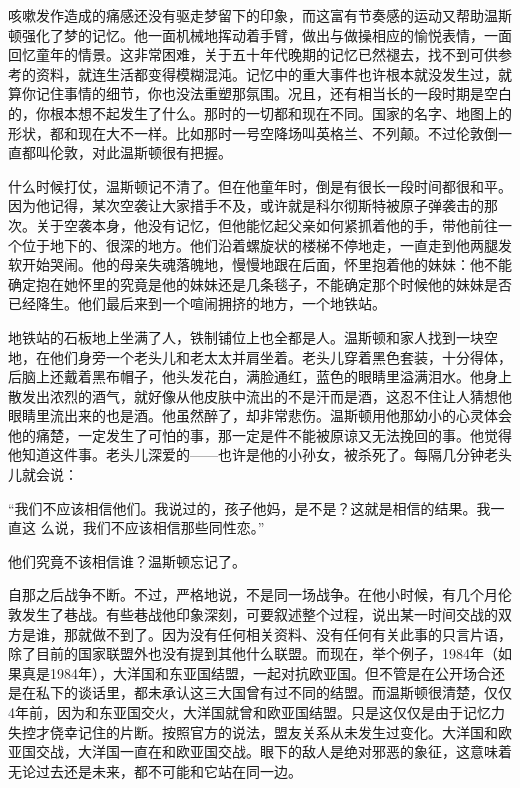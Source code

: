咳嗽发作造成的痛感还没有驱走梦留下的印象，而这富有节奏感的运动又帮助温斯顿强化了梦的记忆。他一面机械地挥动着手臂，做出与做操相应的愉悦表情，一面回忆童年的情景。这非常困难，关于五十年代晚期的记忆已然褪去，找不到可供参考的资料，就连生活都变得模糊混沌。记忆中的重大事件也许根本就没发生过，就算你记住事情的细节，你也没法重塑那氛围。况且，还有相当长的一段时期是空白的，你根本想不起发生了什么。那时的一切都和现在不同。国家的名字、地图上的形状，都和现在大不一样。比如那时一号空降场叫英格兰、不列颠。不过伦敦倒一直都叫伦敦，对此温斯顿很有把握。

什么时候打仗，温斯顿记不清了。但在他童年时，倒是有很长一段时间都很和平。因为他记得，某次空袭让大家措手不及，或许就是科尔彻斯特被原子弹袭击的那次。关于空袭本身，他没有记忆，但他能忆起父亲如何紧抓着他的手，带他前往一个位于地下的、很深的地方。他们沿着螺旋状的楼梯不停地走，一直走到他两腿发软开始哭闹。他的母亲失魂落魄地，慢慢地跟在后面，怀里抱着他的妹妹：他不能确定抱在她怀里的究竟是他的妹妹还是几条毯子，不能确定那个时候他的妹妹是否已经降生。他们最后来到一个喧闹拥挤的地方，一个地铁站。

地铁站的石板地上坐满了人，铁制铺位上也全都是人。温斯顿和家人找到一块空地，在他们身旁一个老头儿和老太太并肩坐着。老头儿穿着黑色套装，十分得体，后脑上还戴着黑布帽子，他头发花白，满脸通红，蓝色的眼睛里溢满泪水。他身上散发出浓烈的酒气，就好像从他皮肤中流出的不是汗而是酒，这忍不住让人猜想他眼睛里流出来的也是酒。他虽然醉了，却非常悲伤。温斯顿用他那幼小的心灵体会他的痛楚，一定发生了可怕的事，那一定是件不能被原谅又无法挽回的事。他觉得他知道这件事。老头儿深爱的——也许是他的小孙女，被杀死了。每隔几分钟老头儿就会说：

``我们不应该相信他们。我说过的，孩子他妈，是不是？这就是相信的结果。我一直这
么说，我们不应该相信那些同性恋。''

他们究竟不该相信谁？温斯顿忘记了。

自那之后战争不断。不过，严格地说，不是同一场战争。在他小时候，有几个月伦敦发生了巷战。有些巷战他印象深刻，可要叙述整个过程，说出某一时间交战的双方是谁，那就做不到了。因为没有任何相关资料、没有任何有关此事的只言片语，除了目前的国家联盟外也没有提到其他什么联盟。而现在，举个例子，1984年（如果真是1984年），大洋国和东亚国结盟，一起对抗欧亚国。但不管是在公开场合还是在私下的谈话里，都未承认这三大国曾有过不同的结盟。而温斯顿很清楚，仅仅4年前，因为和东亚国交火，大洋国就曾和欧亚国结盟。只是这仅仅是由于记忆力失控才侥幸记住的片断。按照官方的说法，盟友关系从未发生过变化。大洋国和欧亚国交战，大洋国一直在和欧亚国交战。眼下的敌人是绝对邪恶的象征，这意味着无论过去还是未来，都不可能和它站在同一边。

